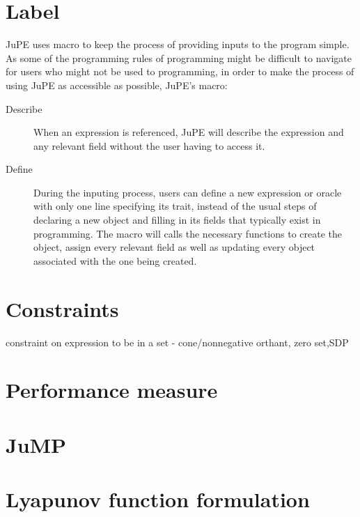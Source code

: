 \section{Label}
JuPE uses macro to keep the process of providing inputs to the program simple. As some of the programming rules of programming might be difficult to navigate for users who might not be used to programming, in order to make the process of using JuPE as accessible as possible, JuPE's macro:
\begin{description}
	\item[Describe] When an expression is referenced, JuPE will describe the expression and any relevant field without the user having to access it.
	\item[Define] During the inputing process, users can define a new expression or oracle with only one line specifying its trait, instead of the usual steps of declaring a new object and filling in its fields that typically exist in programming. The macro will calls the necessary functions to create the object, assign every relevant field as well as updating every  object associated with the one being created.
\end{description}

\section{Constraints}
constraint on expression to be in a set - cone/nonnegative orthant, zero set,SDP
\section{Performance measure}
\section{JuMP}
\section{Lyapunov function formulation}